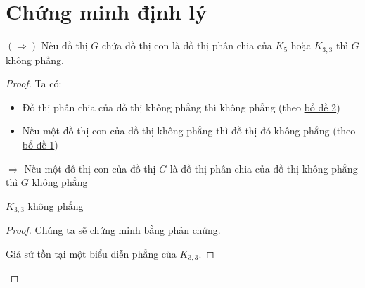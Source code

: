 \section{Chứng minh định lý}
$(\Rightarrow)$  Nếu đồ thị $G$ chứa đồ thị con là đồ thị phân chia của $K_5$ hoặc $K_{3,3}$ thì $G$ không phẳng. \\

\begin{proof}
    Ta có:
    \begin{itemize}
        \item Đồ thị phân chia của đồ thị không phẳng thì không phẳng (theo \hyperref[lem:subp]{bổ đề 2})

        \item Nếu một đồ thị con của dồ thị không phẳng thì đồ thị đó không phẳng (theo \hyperref[lem:plnp]{bổ đề 1})
    \end{itemize}
    $\Rightarrow$ Nếu một đồ thị con của đồ thị $G$ là đồ thị phân chia của đồ thị không phẳng thì $G$ không phẳng
    \begin{lemma}
        $K_{3,3}$ không phẳng
    \end{lemma}

    \begin{proof}
        Chúng ta sẽ chứng minh bằng phản chứng.

        Giả sử tồn tại một biểu diễn phẳng của $K_{3,3}$.


\end{proof}
\end{proof}
